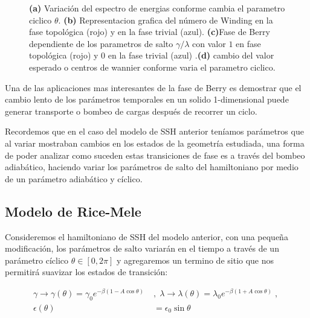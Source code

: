\begin{figure}[tbh!]
\begin{subfigure}[b!]{0.25 \textwidth}
     \end{subfigure}
     \caption{\textbf{(a)} Variación del espectro de energias conforme cambia el parametro ciclico $\theta$. \textbf{(b)} Representacion grafica del número de Winding en la fase topológica (rojo) y en la fase trivial (azul). \textbf{(c)}Fase de Berry dependiente de los parametros de salto $\gamma/\lambda$ con valor $1$ en fase topológica (rojo) y $0$ en la fase trivial (azul) .\textbf{(d)} cambio del valor esperado o centros de wannier conforme varia el parametro ciclico.}
    \label{fig:Pump_example_Results}
\end{figure}

Una de las aplicaciones mas interesantes de la fase de Berry es demostrar que el cambio lento de los parámetros temporales en un solido 1-dimensional puede generar transporte o bombeo de cargas después de recorrer un ciclo.

Recordemos que en el caso del modelo de SSH anterior teníamos parámetros que al variar mostraban cambios en los estados de la geometría estudiada, una forma de poder analizar como suceden estas transiciones de fase es a través del bombeo adiabático, haciendo variar los parámetros de salto del hamiltoniano por medio de un parámetro adiabático y cíclico.

\subsection{Modelo de Rice-Mele}

Consideremos el hamiltoniano de SSH del modelo anterior, con una pequeña modificación, los parámetros de salto variarán en el tiempo a través de un parámetro cíclico $\theta \in \left[ 0 , 2\pi\right]$ y agregaremos un termino de sitio que nos permitirá suavizar los estados de transición:


\begin{align}
    \nonumber\gamma \rightarrow \gamma (\theta) = \gamma_0 e^{\displaystyle-\beta(1 - A \cos \theta )} \; &,\;  \lambda \rightarrow \lambda(\theta) = \lambda_0 e^{\displaystyle-\beta( 1 + A \cos \theta )} \;,\; \\  \epsilon(\theta) &= \epsilon_0 \sin \theta
\end{align}

